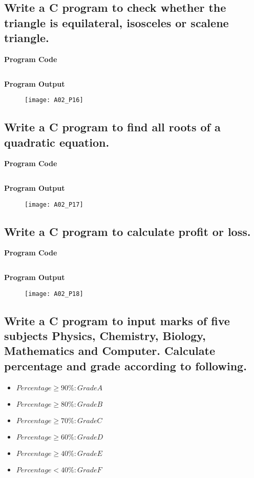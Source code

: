 \subsection{Write a C program to check whether the triangle is equilateral, isosceles or scalene triangle.}
\textbf{Program Code}
\inputminted[breaklines]{C}{programs/A02_P16.c}
\textbf{Program Output}
\begin{figure}[h]
  \texttt{[image: A02\_P16]}
\end{figure}
\pagebreak

\subsection{Write a C program to find all roots of a quadratic equation.}
\textbf{Program Code}
\inputminted[breaklines]{C}{programs/A02_P17.c}
\textbf{Program Output}
\begin{figure}[h]
  \texttt{[image: A02\_P17]}
\end{figure}
\pagebreak

\subsection{Write a C program to calculate profit or loss.}
\textbf{Program Code}
\inputminted[breaklines]{C}{programs/A02_P18.c}
\textbf{Program Output}
\begin{figure}[h]
  \texttt{[image: A02\_P18]}
\end{figure}
\pagebreak

\subsection{Write a C program to input marks of five subjects Physics, Chemistry, Biology, Mathematics and Computer. Calculate percentage and grade according to following.}
\begin{itemize}
  \item $Percentage \geq 90\% : Grade A$
  \item $Percentage \geq 80\% : Grade B$
  \item $Percentage \geq 70\% : Grade C$
  \item $Percentage \geq 60\% : Grade D$
  \item $Percentage \geq 40\% : Grade E$
  \item $Percentage < 40\% : Grade F$
\end{itemize}


